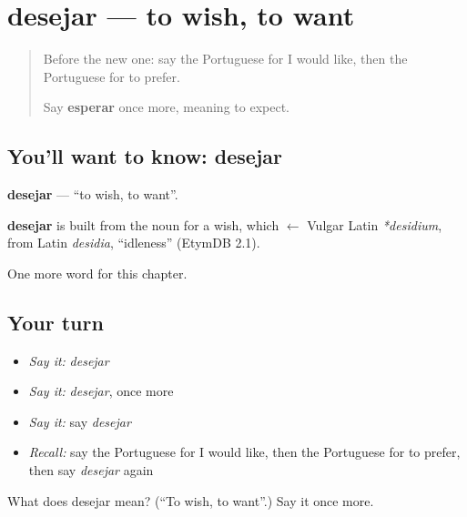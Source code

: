 \section[desejar]{desejar — to wish, to want}

\label{lesson:PT-C83-desejar}



\begin{quote}
Before the new one: say the Portuguese for I would like, then the Portuguese for to prefer.

Say \textbf{esperar} once more, meaning to expect.
\end{quote}

\subsection*{You'll want to know: desejar}
\textbf{desejar} — \textquotedblleft{}to wish, to want\textquotedblright{}.

\begin{cousinweb}
\textbf{desejar} is built from the noun for a wish, which $\leftarrow$ Vulgar Latin \emph{*desidium}, from Latin \emph{desidia}, \textquotedblleft{}idleness\textquotedblright{} (EtymDB 2.1).
\end{cousinweb}

\begin{grammarlens}[title={What you've built}]
One more word for this chapter.
\end{grammarlens}

\subsection*{Your turn}
\begin{itemize}
\raggedright
  \item \emph{Say it:} \emph{desejar}
  \item \emph{Say it:} \emph{desejar}, once more
  \item \emph{Say it:} say \emph{desejar}
  \item \emph{Recall:} say the Portuguese for I would like, then the Portuguese for to prefer, then say \emph{desejar} again
\end{itemize}

\begin{tcolorbox}[breakable,colback=teal!4,colframe=teal!35!black,title={Before you move on}]
What does desejar mean? (\textquotedblleft{}To wish, to want\textquotedblright{}.) Say it once more.
\end{tcolorbox}
